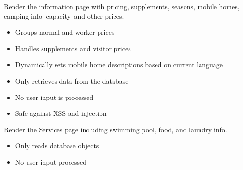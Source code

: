 \documentclass[letterpaper,10pt,french]{sphinxmanual}
\begin{document}
\begin{fulllineitems}
\label{\detokenize{index:core.views.infos_view}}
\pysigstartsignatures
\pysiglinewithargsret
{}
{}
{}
\pysigstopsignatures
\sphinxAtStartPar
Render the information page with pricing, supplements, seasons, mobile homes,
camping info, capacity, and other prices.
\begin{description}
\begin{itemize}
\item {} 
\sphinxAtStartPar
Groups normal and worker prices

\item {} 
\sphinxAtStartPar
Handles supplements and visitor prices

\item {} 
\sphinxAtStartPar
Dynamically sets mobile home descriptions based on current language

\end{itemize}

\begin{itemize}
\item {} 
\sphinxAtStartPar
Only retrieves data from the database

\item {} 
\sphinxAtStartPar
No user input is processed

\item {} 
\sphinxAtStartPar
Safe against XSS and injection

\end{itemize}

\end{description}

\end{fulllineitems}


\begin{fulllineitems}
\label{\detokenize{index:core.views.services_view}}
\pysigstartsignatures
\pysiglinewithargsret
{}
{}
{}
\pysigstopsignatures
\sphinxAtStartPar
Render the Services page including swimming pool, food, and laundry info.
\begin{description}
\begin{itemize}
\item {} 
\sphinxAtStartPar
Only reads database objects

\item {} 
\sphinxAtStartPar
No user input processed

\end{itemize}

\end{description}

\end{fulllineitems}
\end{document}
